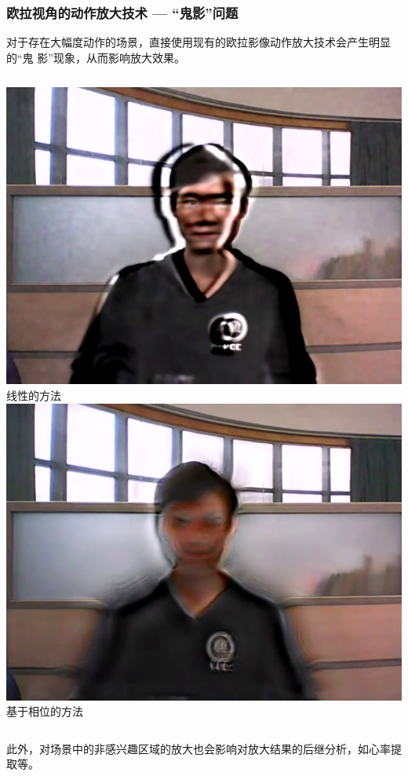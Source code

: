 \documentclass[xcolor=svgnames,serif,table,10pt]{beamer}
\begin{document}
\begin{frame}
  \frametitle{欧拉视角的动作放大技术 --- “鬼影”问题}

  \small
  
  对于存在大幅度动作的场景，直接使用现有的欧拉影像动作放大技术会产生明显的“鬼
  影”现象，从而影响放大效果。

  \medskip

  \begin{columns}
    \small
    \centering
    \includegraphics[width=.9\textwidth]{ghost-linear.png}\\
    线性的方法
    \centering
    \includegraphics[width=.9\textwidth]{ghost-phase.png}\\
    基于相位的方法
  \end{columns}

  \medskip
  
  此外，对场景中的非感兴趣区域的放大也会影响对放大结果的后继分析，如心率提取等。
\end{frame}
\end{document}
